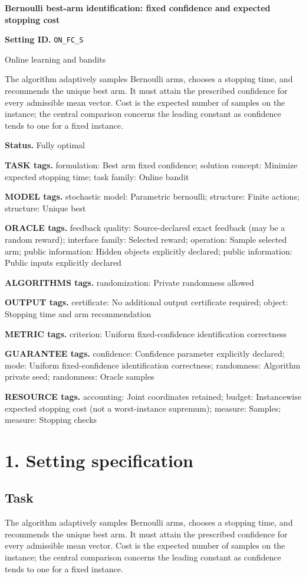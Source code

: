 \documentclass[10pt,a4paper]{article}
\begin{document}
\raggedright

{\LARGE\bfseries\sffamily\color{AtlasNavy} Bernoulli best-arm identification: fixed confidence and expected stopping cost\par}\vspace{5pt}
\textbf{Setting ID.} \texttt{ON\_\allowbreak{}\allowbreak{}FC\_\allowbreak{}\allowbreak{}S}

Online learning and bandits

The algorithm adaptively samples Bernoulli arms, chooses a stopping time, and recommends the unique best arm. It must attain the prescribed confidence for every admissible mean vector. Cost is the expected number of samples on the instance; the central comparison concerns the leading constant as confidence tends to one for a fixed instance.

\textbf{Status.} Fully optimal

\textbf{TASK tags.} formulation: Best arm fixed confidence; solution concept: Minimize expected stopping time; task family: Online bandit

\textbf{MODEL tags.} stochastic model: Parametric bernoulli; structure: Finite actions; structure: Unique best

\textbf{ORACLE tags.} feedback quality: Source-declared exact feedback (may be a random reward); interface family: Selected reward; operation: Sample selected arm; public information: Hidden objects explicitly declared; public information: Public inputs explicitly declared

\textbf{ALGORITHMS tags.} randomization: Private randomness allowed

\textbf{OUTPUT tags.} certificate: No additional output certificate required; object: Stopping time and arm recommendation

\textbf{METRIC tags.} criterion: Uniform fixed-confidence identification correctness

\textbf{GUARANTEE tags.} confidence: Confidence parameter explicitly declared; mode: Uniform fixed-confidence identification correctness; randomness: Algorithm private seed; randomness: Oracle samples

\textbf{RESOURCE tags.} accounting: Joint coordinates retained; budget: Instancewise expected stopping cost (not a worst-instance supremum); measure: Samples; measure: Stopping checks

\section{1. Setting specification}
\subsection{Task}
The algorithm adaptively samples Bernoulli arms, chooses a stopping time, and recommends the unique best arm. It must attain the prescribed confidence for every admissible mean vector. Cost is the expected number of samples on the instance; the central comparison concerns the leading constant as confidence tends to one for a fixed instance.
\end{document}
